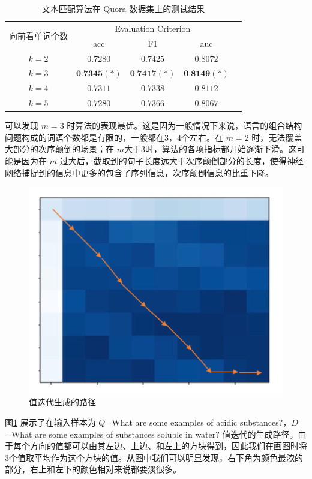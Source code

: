 \begin{table}[htbp]
\caption{文本匹配算法在 Quora 数据集上的测试结果}\label{tab:MDP_test}
\vspace{0.5em}\centering\wuhao
\begin{tabular}{ccccc}
\toprule[1.5pt]
	\multirow{2}{*}{向前看单词个数} &
        \multicolumn{3}{c}{\multirow{1}{*}{Evaluation Criterion}} \\
        \cline{2-4} & acc & F1 & auc \\
        \midrule[1pt]
        $k=2$ & $0.7280$ & $0.7425$ & $0.8072$ \\
        $k=3$ & $\textbf{0.7345}(*)$ & $\textbf{0.7417}(*)$ & $\textbf{0.8149}(*)$ \\
        $k=4$ & $0.7311$ & $0.7338$ & $0.8112$\\
        $k=5$ & $0.7280$ & $0.7366$ & $0.8067$\\
        \bottomrule[1.5pt]
\end{tabular}
\vspace{\baselineskip}
\end{table}

可以发现 $m=3$ 时算法的表现最优。这是因为一般情况下来说，语言的组合结构问题构成的词语个数都是有限的，一般都在3，4个左右。在 $m=2$ 时，无法覆盖大部分的次序颠倒的场景；在 $m$大于3时，算法的各项指标都开始逐渐下滑。这可能是因为在 $m$ 过大后，截取到的句子长度远大于次序颠倒部分的长度，使得神经网络捕捉到的信息中更多的包含了序列信息，次序颠倒信息的比重下降。


\begin{figure}[!htbp]
\vspace{1em}
\centering
  \includegraphics[width=0.5\linewidth]{figures/val_iter_path}
  \caption{值迭代生成的路径}
  \label{fig:val_iter_path}       %
\vspace{1em}
\end{figure}

图\ref{fig:val_iter_path} 展示了在输入样本为 $Q$=What are some examples of acidic substances?，$D$=What are some examples of substances soluble in water? 值迭代的生成路径。由于每个方向的值都可以由其左边、上边、和左上的方块得到，因此我们在画图时将3个值取平均作为这个方块的值。从图中我们可以明显发现，右下角为颜色最浓的部分，右上和左下的颜色相对来说都要淡很多。

